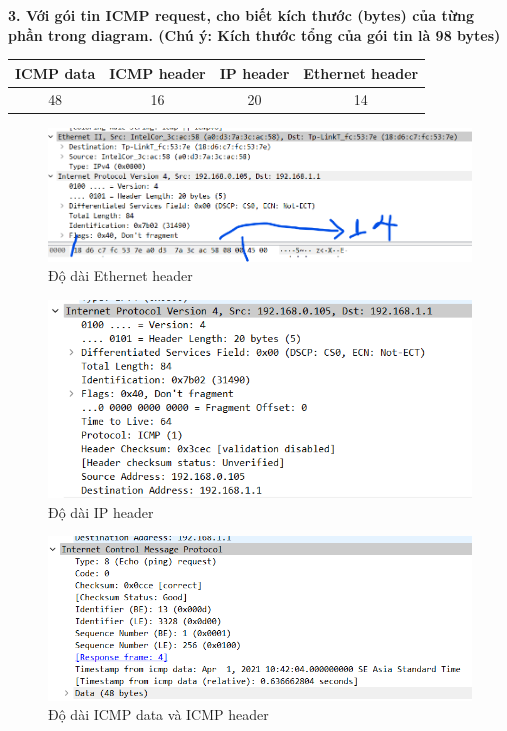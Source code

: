 \textbf{3.	Với gói tin ICMP request, cho biết kích thước (bytes) của từng phần trong diagram. (Chú ý: Kích thước tổng của gói tin là 98 bytes)}

\begin{table}[H]
\begin{center}
\begin{tabular}{|c|c|c|c|}
\hline 
ICMP data & ICMP header & IP header & Ethernet header \\ 
\hline 
48 & 16 & 20 & 14 \\ 
\hline 
\end{tabular} 
\end{center}
\end{table}

\begin{figure}[H]
\begin{center}
\includegraphics[scale=.8]{../figures/p1/p1_ethernet}
\end{center}
\caption{Độ dài Ethernet header}
\end{figure}

\begin{figure}[H]
\begin{center}
\includegraphics[scale=1]{../figures/p1/p1_ipheader}
\end{center}
\caption{Độ dài IP header}
\end{figure}

\begin{figure}[H]
\begin{center}
\includegraphics[scale=1]{../figures/p1/p1_icmp}
\end{center}
\caption{Độ dài ICMP data và ICMP header}
\end{figure}

